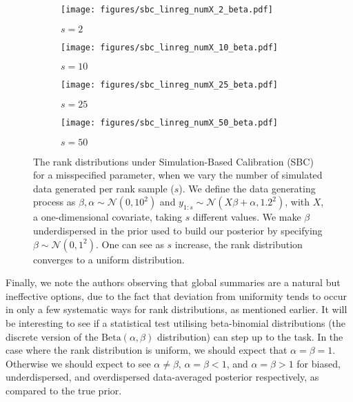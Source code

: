 \documentclass[twoside]{article}
\begin{document}
\begin{figure*}
\begin{center}
\begin{subfigure}[t]{.24\textwidth}
  \texttt{[image: figures/sbc\_linreg\_numX\_2\_beta.pdf]}
  \vspace*{-12pt}
  \caption{$s = 2$}
  \label{fig:sbc_linreg_numX_2_beta}
\end{subfigure}
\hspace*{.001\textwidth}
\begin{subfigure}[t]{.24\textwidth}
  \texttt{[image: figures/sbc\_linreg\_numX\_10\_beta.pdf]}
  \vspace*{-12pt}
  \caption{$s = 10$}
  \label{fig:sbc_linreg_numX_10_beta}
\end{subfigure}
\hspace*{.001\textwidth}
\begin{subfigure}[t]{.24\textwidth}
  \texttt{[image: figures/sbc\_linreg\_numX\_25\_beta.pdf]}
  \vspace*{-12pt}
  \caption{$s = 25$}
  \label{fig:sbc_linreg_numX_25_beta}
\end{subfigure}
\hspace*{.001\textwidth}
\begin{subfigure}[t]{.24\textwidth}
  \texttt{[image: figures/sbc\_linreg\_numX\_50\_beta.pdf]}
  \vspace*{-12pt}
  \caption{$s = 50$}
  \label{fig:sbc_linreg_numX_50_beta}
\end{subfigure}
\end{center}
\vspace*{-7pt}
\caption{The rank distributions under Simulation-Based Calibration (SBC) for a misspecified parameter, when we vary the number of simulated data generated per rank sample ($s$). We define the data generating process as $\beta,\alpha \sim \mathcal{N}(0,10^2)$ and $y_{1:s} \sim \mathcal{N}(X\beta+\alpha,1.2^2)$, with $X$, a one-dimensional covariate, taking $s$ different values. We make $\beta$ underdispersed in the prior used to build our posterior by specifying $\beta \sim \mathcal{N}(0, 1^2)$. One can see as $s$ increase, the rank distribution converges to a uniform distribution.}
\label{fig:sbc_linreg_numX}
\end{figure*}

Finally, we note the authors observing that global summaries are a natural but ineffective options, due to the fact that deviation from uniformity tends to occur in only a few systematic ways for rank distributions, as mentioned earlier. It will be interesting to see if a statistical test utilising beta-binomial distributions (the discrete version of the $\textrm{Beta}(\alpha, \beta)$ distribution) can step up to the task. In the case where the rank distribution is uniform, we should expect that $\alpha = \beta = 1$. Otherwise we should expect to see $\alpha \neq \beta$, $\alpha = \beta < 1$, and $\alpha = \beta > 1$ for biased, underdispersed, and overdispersed data-averaged posterior respectively, as compared to the true prior.
\end{document}
